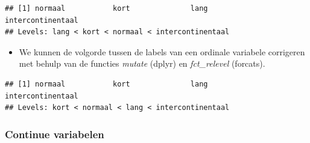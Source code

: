 \documentclass[]{tufte-book}
\newenvironment{Shaded}{}{}
\newcommand{\DataTypeTok}[1]{\textcolor[rgb]{0.56,0.13,0.00}{#1}}
\newcommand{\DecValTok}[1]{\textcolor[rgb]{0.25,0.63,0.44}{#1}}
\newcommand{\KeywordTok}[1]{\textcolor[rgb]{0.00,0.44,0.13}{\textbf{#1}}}
\newcommand{\NormalTok}[1]{#1}
\newcommand{\OperatorTok}[1]{\textcolor[rgb]{0.40,0.40,0.40}{#1}}
\newcommand{\StringTok}[1]{\textcolor[rgb]{0.25,0.44,0.63}{#1}}
\providecommand{\tightlist}{%
  \setlength{\itemsep}{0pt}\setlength{\parskip}{0pt}}
\begin{document}
\begin{verbatim}
## [1] normaal           kort              lang              intercontinentaal
## Levels: lang < kort < normaal < intercontinentaal
\end{verbatim}

\begin{itemize}
\tightlist
\item
  We kunnen de volgorde tussen de labels van een ordinale variabele corrigeren met behulp van de functies \emph{mutate} (dplyr) en \emph{fct\_relevel} (forcats).
\end{itemize}

\begin{Shaded}
\end{Shaded}

\begin{verbatim}
## [1] normaal           kort              lang              intercontinentaal
## Levels: kort < normaal < lang < intercontinentaal
\end{verbatim}

\hypertarget{continue-variabelen}{%
\subsubsection{Continue variabelen}\label{continue-variabelen}}
\end{document}
